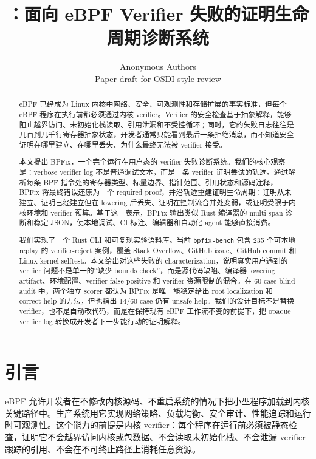 \documentclass[letterpaper,twocolumn,10pt]{article}
\title{\Large\bf
\sys：面向 eBPF Verifier 失败的证明生命周期诊断系统}
\author{
  {\rm Anonymous Authors}\\
  Paper draft for OSDI-style review
}
\date{}
\newcommand{\sys}{\textsc{BPFix}\xspace}
\newcommand{\code}[1]{\texttt{#1}}
\begin{document}
\maketitle

\begin{abstract}
eBPF 已经成为 Linux 内核中网络、安全、可观测性和存储扩展的事实标准，但每个 eBPF 程序在执行前都必须通过内核 verifier。Verifier 的安全检查基于抽象解释，能够阻止越界访问、未初始化栈读取、引用泄漏和不受控循环；同时，它的失败日志往往是几百到几千行寄存器抽象状态，开发者通常只能看到最后一条拒绝消息，而不知道安全证明在哪里建立、在哪里丢失、为什么最终无法被 verifier 接受。

本文提出 \sys，一个完全运行在用户态的 verifier 失败诊断系统。我们的核心观察是：verbose verifier log 不是普通调试文本，而是一条 verifier 证明尝试的轨迹。通过解析每条 BPF 指令处的寄存器类型、标量边界、指针范围、引用状态和源码注释，\sys 将最终错误还原为一个 required proof，并沿轨迹重建证明生命周期：证明从未建立、证明已经建立但在 lowering 后丢失、证明在控制流合并处变弱，或证明受限于内核环境和 verifier 预算。基于这一表示，\sys 输出类似 Rust 编译器的 multi-span 诊断和稳定 JSON，使本地调试、CI 标注、编辑器和自动化 agent 能够直接消费。

我们实现了一个 Rust CLI 和可复现实验语料库。当前 \code{bpfix-bench} 包含 235 个可本地 replay 的 verifier-reject 案例，覆盖 Stack Overflow、GitHub issue、GitHub commit 和 Linux kernel selftest。本文给出对这些失败的 characterization，说明真实用户遇到的 verifier 问题不是单一的“缺少 bounds check”，而是源代码缺陷、编译器 lowering artifact、环境配置、verifier false positive 和 verifier 资源限制的混合。在 60-case blind audit 中，两个独立 scorer 都认为 \sys 是唯一能稳定给出 root localization 和 correct help 的方法，但也指出 14/60 case 仍有 unsafe help。我们的设计目标不是替换 verifier，也不是自动改代码，而是在保持现有 eBPF 工作流不变的前提下，把 opaque verifier log 转换成开发者下一步能行动的证明解释。
\end{abstract}

\section{引言}

eBPF 允许开发者在不修改内核源码、不重启系统的情况下把小型程序加载到内核关键路径中。生产系统用它实现网络策略、负载均衡、安全审计、性能追踪和运行时可观测性。这个能力的前提是内核 verifier：每个程序在运行前必须被静态检查，证明它不会越界访问内核或包数据、不会读取未初始化栈、不会泄漏 verifier 跟踪的引用、不会在不可终止路径上消耗任意资源。
\end{document}
